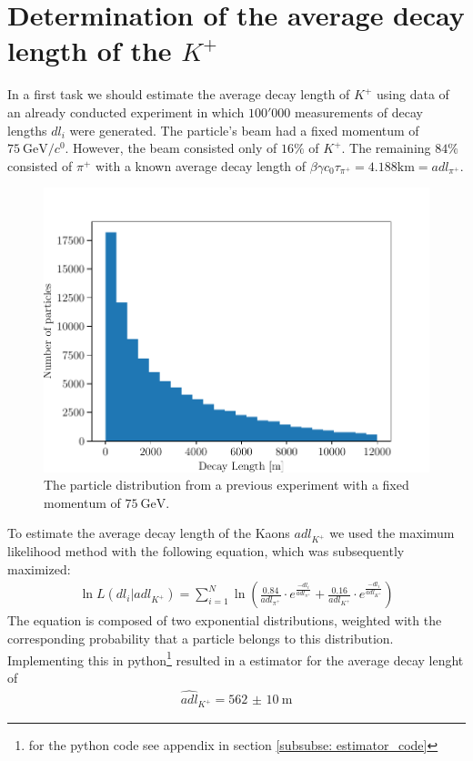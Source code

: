 \documentclass[12pt,a4paper,oneside,english]{article}
\begin{document}
\section{Determination of the average decay length of the $K^+$}
\label{sec: decay_length}
In a first task we should estimate the average decay length of $K^+$ using data of an already conducted experiment in which $100'000$ measurements
of decay lengths $dl_i$ were generated. The particle's beam had a fixed momentum of $\SI{75}{\giga\electronvolt\per\clight}$. However, the beam consisted only of $16\%$ of
$K^+$. The remaining $84\%$ consisted of $\pi^+$ with a known average decay length of $\beta \gamma c_0 \tau_{\pi^+} = 4.188 \si{\kilo\meter} =
adl_{\pi^+}$.
\begin{figure}[H]
\centering
\includegraphics[width=0.8\linewidth]{images/histogram_decay_length.pdf}
	\caption{The particle distribution from a previous experiment with a fixed momentum of $\SI{75}{\giga\electronvolt}$.}
	\label{fig:decay}
\end{figure}
To estimate the average decay length of the Kaons $adl_{K^+}$ we used the maximum likelihood method with
the following equation, which was subsequently maximized:
\begin{align}
\ln L(dl_i|adl_{K^+}) = \sum_{i=1}^{N}\ln\left(\frac{0.84}{adl_{\pi^+}}\cdot e^{\frac{-dl_i}{adl_{\pi^+}}}+\frac{0.16}{adl_{K^+}}\cdot e^{\frac{-dl_i}{adl_{K^+}}}\right)
\end{align}
The equation is composed of two exponential distributions, weighted with the corresponding probability that a particle belongs to this distribution. Implementing this in python\footnote{for the python code see appendix in section \ref{subsubse: estimator_code} } resulted in a estimator for the average decay lenght of
\begin{align}
\widehat{adl}_{K^+} = \SI{562(10)}{\meter}
\end{align}
\end{document}
